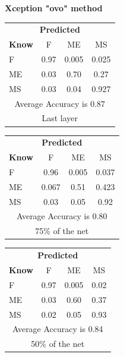 \documentclass[12pt]{article} %
\begin{document}
\begin{center}
\textbf{Xception "ovo" method}
\end{center}
\begin{minipage}{0.5\textwidth}
\begin{center}
\begin{tabular}{l|c|c|c|}
 \multicolumn{4}{c}{ \textbf{ Predicted}}\\
 \textbf{Know}&F&ME&MS\\ \hline\hline
F   &0.97&0.005&0.025\\
ME &0.03&0.70&0.27\\
MS &0.03&0.04&0.927\\
\multicolumn{4}{c}{Average Accuracy is 0.87}\\
\multicolumn{4}{c}{Last layer}\\
\end{tabular}
\end{center}
\end{minipage}
\begin{minipage}{0.5\textwidth}
\begin{center}
\begin{tabular}{l|c|c|c|}
 \multicolumn{4}{c}{ \textbf{ Predicted}}\\
 \textbf{Know}&F&ME&MS\\ \hline\hline
F    &0.96&0.005&0.037\\
ME &0.067&0.51&0.423\\
MS &0.03&0.05&0.92\\
\multicolumn{4}{c}{Average Accuracy is 0.80}\\
\multicolumn{4}{c}{75\%  of the net}\\
\end{tabular}
\end{center}
\end{minipage}
\begin{minipage}{0.5\textwidth}
\begin{center}
\begin{tabular}{l|c|c|c|}
 \multicolumn{4}{c}{ \textbf{ Predicted}}\\
 \textbf{Know}&F&ME&MS\\ \hline\hline
F   &0.97&0.005&0.02\\
ME &0.03&0.60&0.37\\
MS &0.02&0.05&0.93\\
\multicolumn{4}{c}{Average Accuracy is 0.84}\\
\multicolumn{4}{c}{50\%  of the net}\\
\end{tabular}
\end{center}
\end{minipage}
\end{document}
